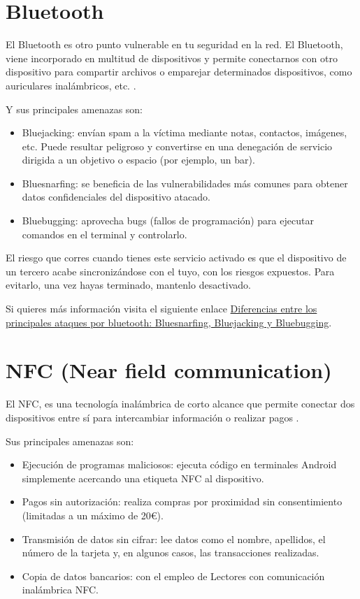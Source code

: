 \documentclass[
  a4paper,
  openany]{book}
\begin{document}
\hypertarget{bluetooth}{%
\section{Bluetooth}\label{bluetooth}}

El Bluetooth es otro punto vulnerable en tu seguridad en la red. El Bluetooth, viene incorporado en multitud de dispositivos y permite conectarnos con otro dispositivo para compartir archivos o emparejar determinados dispositivos, como auriculares inalámbricos, etc. \citep{IONOS-bluetooh}.

Y sus principales amenazas son:

\begin{itemize}
\item
  Bluejacking: envían spam a la víctima mediante notas, contactos, imágenes, etc. Puede resultar peligroso y convertirse en una denegación de servicio dirigida a un objetivo o espacio (por ejemplo, un bar).
\item
  Bluesnarfing: se beneficia de las vulnerabilidades más comunes para obtener datos confidenciales del dispositivo atacado.
\item
  Bluebugging: aprovecha bugs (fallos de programación) para ejecutar comandos en el terminal y controlarlo.
\end{itemize}

El riesgo que corres cuando tienes este servicio activado es que el dispositivo de un tercero acabe sincronizándose con el tuyo, con los riesgos expuestos. Para evitarlo, una vez hayas terminado, mantenlo desactivado.

Si quieres más información visita el siguiente enlace \href{https://computerhoy.com/noticias/tecnologia/diferencias-principales-ataques-bluetooth-bluesnarfing-bluejacking-bluebugging-1087867}{Diferencias entre los principales ataques por bluetooth: Bluesnarfing, Bluejacking y Bluebugging}.

\hypertarget{nfc-near-field-communication}{%
\section{NFC (Near field communication)}\label{nfc-near-field-communication}}

El NFC, es una tecnología inalámbrica de corto alcance que permite conectar dos dispositivos entre sí para intercambiar información o realizar pagos \citep{IONOS-nfc}.

Sus principales amenazas son:

\begin{itemize}
\item
  Ejecución de programas maliciosos: ejecuta código en terminales Android simplemente acercando una etiqueta NFC al dispositivo.
\item
  Pagos sin autorización: realiza compras por proximidad sin consentimiento (limitadas a un máximo de 20€).
\item
  Transmisión de datos sin cifrar: lee datos como el nombre, apellidos, el número de la tarjeta y, en algunos casos, las transacciones realizadas.
\item
  Copia de datos bancarios: con el empleo de Lectores con comunicación inalámbrica NFC.
\end{itemize}
\end{document}
